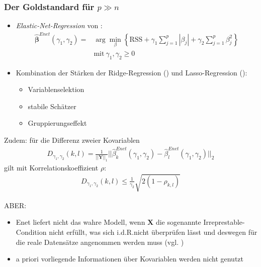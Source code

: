 \documentclass{beamer}
\begin{document}
\begin{frame}
\frametitle{Der \glqq Goldstandard{\grqq} für $p \gg n$}
	\begin{itemize}
	\item \textit{Elastic-Net-Regression} von \cite{zou_regularization_2005}:
	\begin{align*}
	\boldsymbol{\hat{\beta}}^{Enet}(\gamma_1, \gamma_2)=&\arg \displaystyle\min_{\beta} \left\lbrace \text{RSS}  + \gamma_1 \sum_{j=1}^{p}|\beta_j| + \gamma_2 \sum_{j=1}^{p}\beta_j^2 \right\rbrace\\ &\text{mit} \ \gamma_1,\gamma_2 \ge 0
	\end{align*}
	\item Kombination der Stärken der Ridge-Regression (\cite{hoerl_ridge_1970}) und Lasso-Regression (\cite{tibshirani96regression}):
	\begin{itemize}
	\item Variablenselektion 
	\item stabile Schätzer
	\item Gruppierungseffekt
	\end{itemize}	
	\end{itemize}
\end{frame}

\begin{frame}
	Zudem: für die Differenz zweier Kovariablen
		\begin{align*}
		D_{\gamma_1,\gamma_2}(k,l)=\frac{1}{||\mathbf{Y}||_1}||\hat{\beta}_k^{Enet}(\gamma_1,\gamma_2)-\hat{\beta}_l^{Enet}(\gamma_1,\gamma_2)||_2
		\end{align*}
		gilt mit Korrelationskoeffizient $\rho$:
		\begin{align*}
		D_{\gamma_1,\gamma_2}(k,l) \leq \frac{1}{\gamma_2}\sqrt{2(1-\rho_{k,l})}
		\end{align*}
\end{frame}

\begin{frame}
	ABER:
	\begin{itemize}
	\item Enet liefert nicht das wahre Modell, wenn $\mathbf{X}$ die sogenannte Irreprestable-Condition nicht erfüllt, was sich i.d.R.nicht überprüfen lässt und deswegen für die reale Datensätze angenommen werden muss (vgl. \cite{jia_2008Enet_Consistency})
	\item a priori vorliegende Informationen über Kovariablen werden nicht genutzt
	\end{itemize}
\end{frame}
\end{document}
